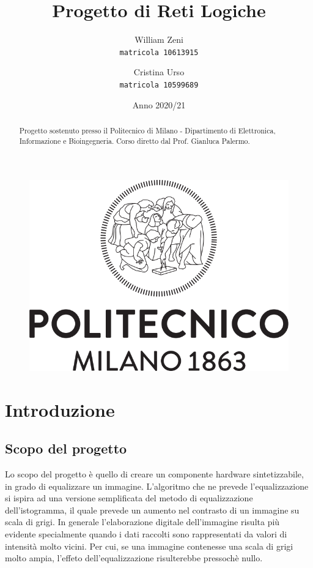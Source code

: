 \documentclass[11pt, a4paper]{article}
\title{Progetto di Reti Logiche}
\author{
  William Zeni\\
  \texttt{matricola 10613915}
  \and
  Cristina Urso\\
  \texttt{matricola 10599689}
}
\date{Anno 2020/21}
\begin{document}
\begin{figure}[t]
  \centering
  \vspace{3cm}
  \includegraphics[scale=0.4]{Logo_Politecnico_Milano.png}
  \vspace{3cm}
\end{figure}

\maketitle
\renewcommand{\abstractname}{ }
\begin{abstract}
  \centering
  Progetto sostenuto presso il Politecnico di Milano - Dipartimento di Elettronica, Informazione e Bioingegneria. Corso diretto dal Prof. Gianluca Palermo.
\end{abstract}

\thispagestyle{empty}
\pagebreak
\tableofcontents
\thispagestyle{empty}
\pagebreak
{}


\section{Introduzione}
\subsection{Scopo del progetto}
Lo scopo del progetto è quello di creare un componente hardware sintetizzabile, in grado di equalizzare un immagine. L'algoritmo che ne prevede l'equalizzazione si ispira ad una versione semplificata del metodo di equalizzazione dell'istogramma, il quale prevede un aumento nel contrasto di un immagine su scala di grigi. In generale l'elaborazione digitale dell'immagine risulta più evidente specialmente quando i dati raccolti sono rappresentati da valori di intensità molto vicini. Per cui, se una immagine contenesse una scala di grigi molto ampia, l'effeto dell'equalizzazione risulterebbe pressochè nullo.
\end{document}
